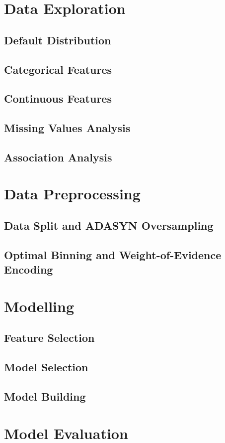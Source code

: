 \section{Data Exploration}
\subsection{Default Distribution}
\subsection{Categorical Features}
\subsection{Continuous Features}
\subsection{Missing Values Analysis}
\subsection{Association Analysis}
\section{Data Preprocessing}
\subsection{Data Split and ADASYN Oversampling}
\subsection{Optimal Binning and Weight-of-Evidence Encoding}
\section{Modelling}
\subsection{Feature Selection}
\subsection{Model Selection}
\subsection{Model Building}
\section{Model Evaluation}
